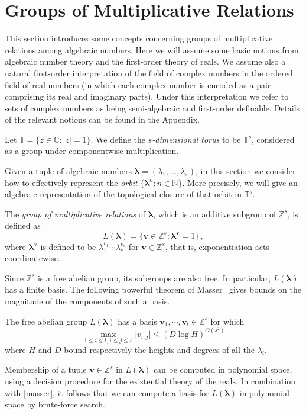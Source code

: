 \section{Groups of Multiplicative Relations}
\label{sec:mult}

This section introduces some concepts concerning groups of
multiplicative relations among algebraic numbers.  Here we will assume
some basic notions from algebraic number theory and the first-order
theory of reals.  We assume also a natural first-order interpretation of
the field of complex numbers in the ordered field of real numbers (in
which each complex number is encoded as a pair comprising its real and
imaginary parts).  Under this interpretation we refer to sets of
complex numbers as being semi-algebraic and first-order definable.
Details of the relevant notions can be found in the Appendix.

Let $\mathbb{T}=\lbrace z\in\mathbb{C}: \lvert z\rvert =1\rbrace$.  We
define the \emph{$s$-dimensional torus} to be $\mathbb{T}^s$,
considered as a group under componentwise multiplication.

Given a tuple of algebraic numbers
$\boldsymbol\lambda=(\lambda_1,\ldots,\lambda_s)$, in this section we
consider how to effectively represent the \emph{orbit} $\{
\boldsymbol\lambda^n : n \in \mathbb{N}\}$.  More
precisely, we will give an algebraic representation of the topological
closure of that orbit in $\mathbb{T}^s$.

The \emph{group of multiplicative relations} of
$\boldsymbol{\lambda}$, which is an additive subgroup of
$\mathbb{Z}^s$, is defined as
\begin{equation*}
L(\boldsymbol{\lambda})=\lbrace \boldsymbol{v}\in \mathbb{Z}^s : \boldsymbol\lambda^{\boldsymbol v}=1 \rbrace \, ,
\end{equation*}
where $\boldsymbol\lambda^{\boldsymbol v}$ is defined to be
$\lambda_1^{v_1}\cdots\lambda_s^{v_s}$ for $\boldsymbol{v}\in \mathbb{Z}^s$, that is, exponentiation acts
coordinatewise.

Since $\mathbb{Z}^s$ is a free abelian group, its subgroups are also
free.  In particular, $L(\boldsymbol\lambda)$ has a finite basis. The
following powerful theorem of Masser~\cite{Mas88} gives bounds on the
magnitude of the components of such a basis.

\begin{theorem}[Masser]
\label{masser}
The free abelian group $L(\boldsymbol{\lambda})$ has a basis $\boldsymbol{v}_1,\cdots,\boldsymbol{v}_l\in\mathbb{Z}^s$ for which
\[ \max\limits_{1\leq i\leq l,1\leq j\leq s} \lvert v_{i,j} \rvert \leq (D\log H)^{O(s^2)} \]
where $H$ and $D$ bound respectively the heights and degrees of all the $\lambda_i$.
\end{theorem}
Membership of a tuple $\boldsymbol{v}\in \mathbb{Z}^s$ in
$L(\boldsymbol{\lambda})$ can be computed in polynomial space, using a
decision procedure for the existential theory of the reals.  In
combination with \cref{masser}, it follows that we can compute
a basis for $L(\boldsymbol{\lambda})$ in polynomial space by
brute-force search.

